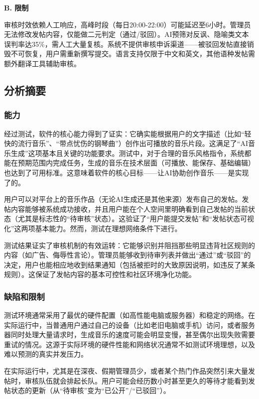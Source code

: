\documentclass{base}
\numberwithin{figure}{section} %
\begin{document}
\textbf{B. 限制}

审核时效依赖人工响应，高峰时段（每日20:00-22:00）可能延迟至6小时。管理员无法修改发帖内容，仅能做二元判定（通过/驳回）。AI预筛对反讽、隐喻类文本误判率达35\%，需人工大量复核。系统不提供审核申诉渠道——被驳回发帖直接销毁不可恢复，用户需重新撰写提交。语言支持仅限于中文和英文，其他语种发帖需额外翻译工具辅助审核。

\subsection{分析摘要}
\subsubsection{能力}

经过测试，软件的核心能力得到了证实：它确实能根据用户的文字描述（比如“轻快的流行音乐”、“带点忧伤的钢琴曲”）创作出可播放的音乐片段。这满足了“AI音乐生成”这项基本且关键的功能要求。测试中，对于合理的音乐风格指令，系统都能在预期范围内完成任务，生成的音乐在技术层面（可播放、能保存、基础编辑）也达到了可用标准。这意味着软件的核心目标——让AI协助创作音乐——是实现了的。

用户可以对平台上的音乐作品（无论AI生成还是其他来源）发布自己的发帖。发帖内容能够被系统成功接收，并且用户能在个人空间里明确看到自己发帖的当前状态（尤其是标志性的“待审核”状态）。这验证了“用户能提交发帖”和“发帖状态可视化”这两项基本能力。然而，测试在理想网络条件下进行。

测试结果证实了审核机制的有效运转：它能够识别并阻挡那些明显违背社区规则的内容（如广告、侮辱性言论）。管理员能够收到待审列表并做出“通过”或“驳回”的决定，用户也能相应地收到结果通知（包括被拒时的大致原因说明，如违反了某条规则）。这保证了发帖内容的基本可控性和社区环境净化功能。

\subsubsection{缺陷和限制}

测试环境通常采用了最优的硬件配置（如高性能电脑或服务器）和稳定的网络。在实际运行中，当普通用户通过自己的设备（比如老旧电脑或手机）访问，或者服务器同时处理大量请求时，生成音乐的速度可能会明显变慢，甚至偶尔出现失败需要重试的情况。这源于实际环境的硬件性能和网络状况通常不如测试环境理想，以及难以预测的真实并发压力。

在实际运行中，尤其是在深夜、假期管理员少，或者某个热门作品突然引来大量发帖时，审核队伍就会排起长队。用户可能会经历数小时甚至更久的等待才能看到发帖状态的更新（从“待审核”变为“已公开”/“已驳回”）。
\end{document}
